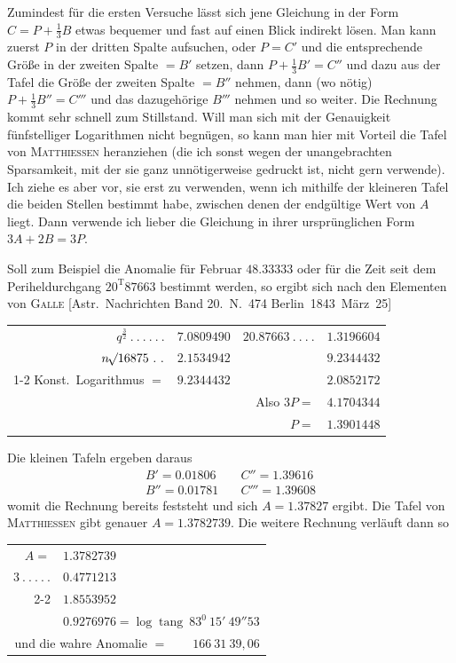 %
Zumindest für die ersten Versuche lässt sich jene Gleichung in der Form $C=P+\frac13B$ etwas bequemer und fast auf einen Blick indirekt lösen. Man kann zuerst $P$ in der dritten Spalte aufsuchen, oder $P=C'$ und die entsprechende Größe in der zweiten Spalte $=B'$ setzen, dann $P+\frac13B'=C''$ und dazu aus der Tafel die Größe der zweiten Spalte $=B''$ nehmen, dann (wo nötig) $P+\frac13B''=C'''$ und das dazugehörige $B'''$ nehmen und so weiter. Die Rechnung kommt sehr schnell zum Stillstand. Will man sich mit der Genauigkeit fünfstelliger Logarithmen nicht begnügen, so kann man hier mit Vorteil die Tafel von \textsc{Matthiessen} heranziehen (die ich sonst wegen der unangebrachten Sparsamkeit, mit der sie ganz unnötigerweise gedruckt ist, nicht gern verwende). Ich ziehe es aber vor, sie erst zu verwenden, wenn ich mithilfe der kleineren Tafel die beiden Stellen bestimmt habe, zwischen denen der endgültige Wert von $A$ liegt. Dann verwende ich lieber die Gleichung in ihrer ursprünglichen Form $3A+2B=3P$.

Soll zum Beispiel die Anomalie für Februar $48.33333$ oder für die Zeit seit dem Periheldurchgang $20^{\mathrm T}87663$ bestimmt werden, so ergibt sich nach den Elementen von \textsc{Galle} [Astr.\ Nachrichten Band 20.\ N.\ 474 Berlin~1843~März~25]
\begin{center}
{\small\setlength{\tabcolsep}{3pt}
\begin{tabular}{r@{\ }r@{\qquad}r@{\ }r}
$q^{\frac32}\ .\ .\ .\ .\ .\ .$&$7.0809490$&$20.87663\ .\ .\ .\ .$&$1.3196604$\\
$n\mathord{{}^{}\!\surd}16875\ .\ .$&$2.1534942$&&$9.2344432$\\\cline{1-2}\cline{4-4}
Konst.\ Logarithmus $=$&$9.2344432$&&$2.0852172$\\[3pt]
&&Also $3P=$&$4.1704344$\\
&&$P=$&$1.3901448$
\end{tabular}}
\end{center}
Die kleinen Tafeln ergeben daraus
\[
\begin{array}{ll}
B'=0.01806&\quad C''=1.39616\\
B''=0.01781&\quad C'''=1.39608
\end{array}
\]
womit die Rechnung bereits feststeht und sich $A=1.37827$ ergibt. Die Tafel von \textsc{Matthiessen} gibt genauer $A=1.3782739$. Die weitere Rechnung verläuft dann so
\begin{center}
\begin{tabular}{r@{\ }l}
$A=$&$1.3782739$\\
$3\ .\ .\ .\ .\ .$&$0.4771213$\\\cline{2-2}
&$1.8553952$\\[3pt]
&$0.9276976=\log\operatorname{tang}\ 83^0\ 15'\ 49''53$\\
\multicolumn{2}{r}{und die wahre Anomalie $=\qquad166\ 31\ 39{,}06$}
\end{tabular}
\end{center}

